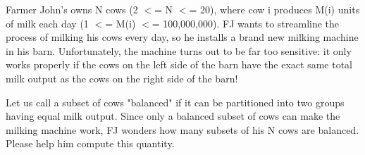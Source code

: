 Farmer John's owns N cows (2 $<$= N $<$= 20), where cow i produces M(i) units of milk each day (1 $<$= M(i) $<$= 100,000,000).  FJ wants to streamline the process of milking his cows every day, so he installs a brand new milking machine in his barn.  Unfortunately, the machine turns out to be far too sensitive: it only works properly if the cows on the left side of the barn have the exact same total milk output as the cows on the right side of the barn! 

Let us call a subset of cows "balanced" if it can be partitioned into two groups having equal milk output.  Since only a balanced subset of cows can make the milking machine work, FJ wonders how many subsets of his N cows are balanced.  Please help him compute this quantity.